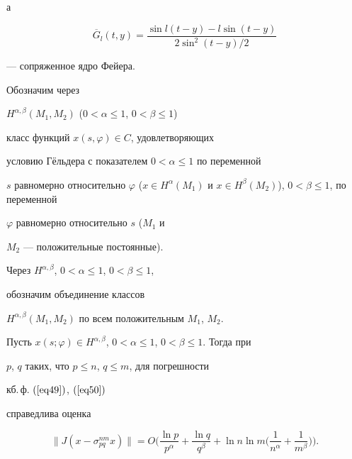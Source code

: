 а


$$


\overline{G}_l(t,y) = \frac{\sin l(t-y)-l\sin(t-y)}{2\sin^2(t-y)/2}


$$


--- сопряженное ядро Фейера.





Обозначим через


$H^{\alpha,\beta}(M_1,M_2)$ ($0<\alpha\leq1$, $0<\beta\leq1$)


класс функций $x(s,\varphi)\in C$, удовлетворяющих


условию Г\"ельдера с показателем $0<\alpha\leq1$ по переменной


$s$ равномерно относительно $\varphi$ ($x\in


H^\alpha(M_1)$ и $x\in


H^\beta(M_2)$), $0<\beta\leq1$, по переменной


$\varphi$ равномерно относительно $s$ ($M_1$ и


$M_2$ --- положительные постоянные).





Через $H^{\alpha,\beta}$, $0<\alpha\leq1$, $0<\beta\leq1$,


обозначим объединение классов


$H^{\alpha,\beta}(M_1,M_2)$ по всем положительным $M_1$, $M_2$.








\begin{thm}\label{th8}


Пусть $x(s;\varphi)\in


H^{\alpha,\beta}$, $0<\alpha\leq1$, $0<\beta\leq1$. Тогда при


$p$, $q$ таких, что $p\leq n$, $q\leq m$, для погрешности


кб.\,ф. $(\ref{eq49})$, $(\ref{eq50})$


справедлива оценка


$$


\|J(x-\sigma_{pq}^{nm}x)\| =


O\bigg(\frac{\ln p}{p^\alpha} + \frac{\ln q}{q^\beta} + \ln n\ln m


\bigg(\frac{1}{n^\alpha} + \frac{1}{m^\beta}\bigg)\bigg).


$$


\end{thm}








